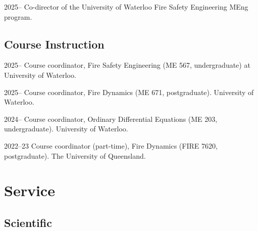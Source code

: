 \documentclass[12pt,letterpaper]{report}
\begin{document}
        \begin{tablist}
        
        \item{2025--} \tab Co-director of the University of Waterloo Fire Safety Engineering MEng program.
        
        \end{tablist}

    	\subsection*{Course Instruction}   
   
    \begin{tablist}

        \item[2025--] \tab Course coordinator, Fire Safety Engineering (ME 567, undergraduate) at University of Waterloo.
        
        \item[2025--] \tab Course coordinator, Fire Dynamics (ME 671, postgraduate). University of Waterloo.
        
        \item[2024--] \tab Course coordinator, Ordinary Differential Equations (ME 203, undergraduate). University of Waterloo.
        
    	\item[2022--23] \tab Course coordinator (part-time), Fire Dynamics (FIRE 7620, postgraduate). The University of Queensland.    	
                        
	\end{tablist} 	
    
    \section*{Service}

    \subsection*{Scientific}
    
\end{document}
